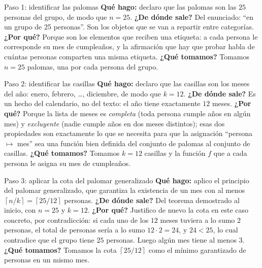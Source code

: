 \documentclass[11pt]{article}
\begin{document}
\begin{sol}

\begin{paso}{Paso 1: identificar las palomas}
\textbf{Qu\'e hago:} declaro que las palomas son las $25$ personas del grupo, de modo que $n=25$.
\textbf{¿De d\'onde sale?} Del enunciado: ``en un grupo de 25 personas''. Son los objetos que se van a repartir entre categor\'ias.
\textbf{¿Por qu\'e?} Porque son los elementos que reciben una etiqueta: a cada persona le corresponde su mes de cumplea\~nos, y la afirmaci\'on que hay que probar habla de cu\'antas personas comparten una misma etiqueta.
\textbf{¿Qu\'e tomamos?} Tomamos $n=25$ palomas, una por cada persona del grupo.
\end{paso}

\begin{paso}{Paso 2: identificar las casillas}
\textbf{Qu\'e hago:} declaro que las casillas son los meses del a\~no: enero, febrero, \dots, diciembre, de modo que $k=12$.
\textbf{¿De d\'onde sale?} Es un hecho del calendario, no del texto: el a\~no tiene exactamente $12$ meses.
\textbf{¿Por qu\'e?} Porque la lista de meses es \emph{completa} (toda persona cumple a\~nos en alg\'un mes) y \emph{excluyente} (nadie cumple a\~nos en dos meses distintos); esas dos propiedades son exactamente lo que se necesita para que la asignaci\'on ``persona $\mapsto$ mes'' sea una funci\'on bien definida del conjunto de palomas al conjunto de casillas.
\textbf{¿Qu\'e tomamos?} Tomamos $k=12$ casillas y la funci\'on $f$ que a cada persona le asigna su mes de cumplea\~nos.
\end{paso}

\begin{paso}{Paso 3: aplicar la cota del palomar generalizado}
\textbf{Qu\'e hago:} aplico el principio del palomar generalizado, que garantiza la existencia de un mes con al menos $\left\lceil n/k\right\rceil = \left\lceil 25/12\right\rceil$ personas.
\textbf{¿De d\'onde sale?} Del teorema demostrado al inicio, con $n=25$ y $k=12$.
\textbf{¿Por qu\'e?} Justifico de nuevo la cota en este caso concreto, por contradicci\'on: si cada uno de los $12$ meses tuviera a lo sumo $2$ personas, el total de personas ser\'ia a lo sumo $12\cdot 2 = 24$, y $24 < 25$, lo cual contradice que el grupo tiene $25$ personas. Luego alg\'un mes tiene al menos $3$.
\textbf{¿Qu\'e tomamos?} Tomamos la cota $\left\lceil 25/12\right\rceil$ como el m\'inimo garantizado de personas en un mismo mes.
\end{paso}


\end{sol}
\end{document}
